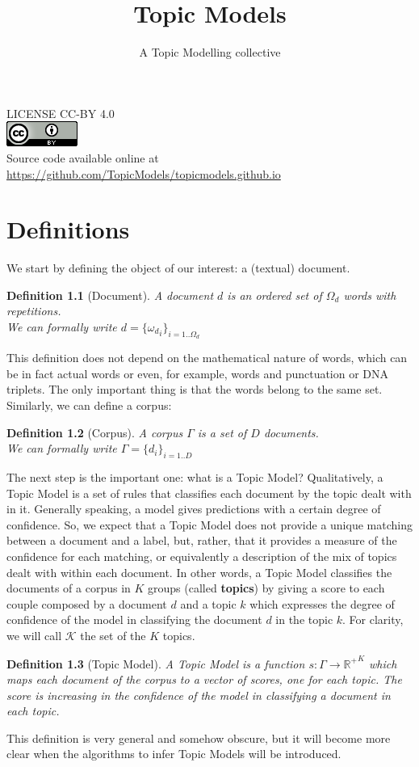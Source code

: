 \documentclass[11pt, a4paper, oneside, openright]{book}
\title{Topic Models}
\author{A Topic Modelling collective}
\newtheorem{definition}{Definition}
\begin{document}
\maketitle

LICENSE CC-BY 4.0 \\
\includegraphics{fig/cc-by}\\
Source code available online at \url{https://github.com/TopicModels/topicmodels.github.io}
\clearpage

\tableofcontents

\chapter{Definitions}

We start by defining the object of our interest: a (textual) document.
\begin{definition}[Document]
	\label{def:doc}
	A document $d$ is an ordered set of $\Omega_d$ words with repetitions. \\
	We can formally write $d = \{{\omega_d}_i\}_{i=1..\Omega_d}$
\end{definition}
This definition does not depend on the mathematical nature of words, which can be in fact actual words or even, for example, words and punctuation or DNA triplets. The only important thing is that the words belong to the same set. \\
Similarly, we can define a corpus:
\begin{definition}[Corpus]
	A corpus $\Gamma$ is a set of $D$ documents. \\
	We can formally write $\Gamma = \{d_i\}_{i=1..D}$
\end{definition}

The next step is the important one: what is a Topic Model?
Qualitatively, a Topic Model is a set of rules that classifies each document by the topic dealt with in it.
Generally speaking, a model gives predictions with a certain degree of confidence. 
So, we expect that a Topic Model does not provide a unique matching between a document and a label, but, rather, that it provides a measure of the confidence for each matching, or equivalently a description of the mix of topics dealt with within each document.
In other words, a Topic Model classifies the documents of a corpus in $K$ groups (called \textbf{topics}) by giving a score to each couple composed by a document $d$ and a topic $k$ which expresses the degree of confidence of the model in classifying the document $d$ in the topic $k$.
For clarity, we will call $\mathcal{K}$ the set of the $K$ topics.
\begin{definition}[Topic Model]
	\label{def:tm}
	A Topic Model is a function $s: \Gamma \rightarrow {\mathbb{R}^+}^K$ which maps each document of the corpus to a vector of scores, one for each topic. The score is increasing in the confidence of the model in classifying a document in each topic.
\end{definition}
This definition is very general and somehow obscure, but it will become more clear when the algorithms to infer Topic Models will be introduced.
\end{document}
